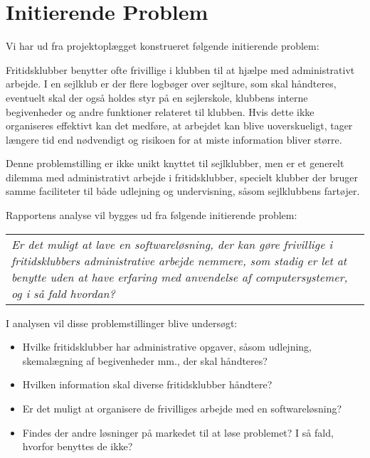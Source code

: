 \section{Initierende Problem}
Vi har ud fra projektoplægget konstrueret følgende initierende problem: 

Fritidsklubber benytter ofte frivillige i klubben til at hjælpe med administrativt arbejde.
I en sejlklub er der flere logbøger over sejlture, som skal håndteres, eventuelt skal der også holdes styr på en sejlerskole, klubbens interne begivenheder og andre funktioner relateret til klubben.
Hvis dette ikke organiseres effektivt kan det medføre, at arbejdet kan blive uoverskueligt, tager længere tid end nødvendigt og risikoen for at miste information bliver større.

Denne problemstilling er ikke unikt knyttet til sejlklubber, men er et generelt dilemma med administrativt arbejde i fritidsklubber, specielt klubber der bruger samme faciliteter til både udlejning og undervisning, såsom sejlklubbens fartøjer. 

Rapportens analyse vil bygges ud fra følgende initierende problem:
\begin{center}
  \begin{tabular}{|p{14cm}|}
	\textit{Er det muligt at lave en softwareløsning, der kan gøre frivillige i fritidsklubbers administrative
	arbejde nemmere, som stadig er let at benytte uden at have  erfaring med anvendelse af computersystemer, og i så fald hvordan?}
  \end{tabular}
\end{center}

I analysen vil disse problemstillinger blive undersøgt:

\begin{itemize}
  \item Hvilke fritidsklubber har administrative opgaver, såsom udlejning, skemalægning af begivenheder mm., der
        skal håndteres?
  \item Hvilken information skal diverse fritidsklubber håndtere?
  \item Er det muligt at organisere de frivilliges arbejde med en softwareløsning?
  \item Findes der andre løsninger på markedet til at løse problemet? I så fald, hvorfor benyttes de ikke?
\end{itemize}